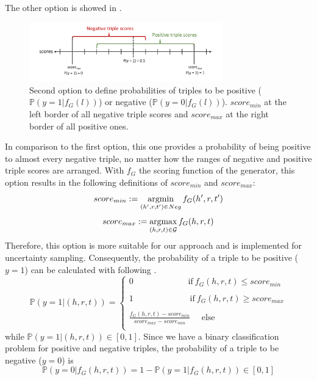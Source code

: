 The other option is showed in .
\begin{figure}[t]
  \centering
    \includegraphics[width=0.75\textwidth]{figures/positives_negatives2.pdf}
  \caption{Second option to define probabilities of triples to be positive ($\mathds{P}(y = 1 | f_G(l))$) or negative ($\mathds{P}(y = 0 | f_G(l))$). 
  $score_{min}$ at the left border of all negative triple scores and $score_{max}$ at the right border of all positive ones.}
  \label{fig:positives_negatives2}
\end{figure}
In comparison to the first option, this one provides a probability of being positive to almost every negative triple, no matter how the ranges of negative and positive triple scores are arranged.
With $f_G$ the scoring function of the generator, this option results in the following definitions of $score_{min}$ and $score_{max}$:
\begin{equation} \label{eqn:opt1_score_min}
    score_{min} := \operatorname*{argmin}_{(h',r,t') \in Neg}{f_G(h',r,t')}
\end{equation}
\begin{equation} \label{eqn:opt1_score_max}
    score_{max} := \operatorname*{argmax}_{(h,r,t) \in \mathcal{G}}{f_G(h,r,t)}
\end{equation}
Therefore, this option is more suitable for our approach and is implemented for uncertainty sampling.
Consequently, the probability of a triple to be positive ($y = 1$) can be calculated with following .
\begin{equation}  \label{eqn:positive_probability}
    \mathds{P}(y = 1|(h, r, t)) =
    \begin{cases}
        0 \ \ \ \ \ \ \ \ \ \ \ \ \ \ \ \ \ \ \ \ \ \ \ \ \ \ \  \ \   
         \text{if} \  f_G(h,r,t) \leq score_{min}
         
        \\ \\
        1 \ \ \ \ \ \ \ \ \ \ \ \ \ \ \ \ \ \ \ \ \ \ \ \ \ \ \   \ \ \
        \text{if} \ f_G(h,r,t) \geq score_{max}
         
        \\ \\
        \frac{f_G(h,r,t) - score_{min}}{score_{max} - score_{min}}
        \ \ \ \ \ \ 
         \text{else}
        \\
    \end{cases} 
\end{equation}
while $\mathds{P}(y = 1|(h, r, t))  \in [0, 1]$.
Since we have a binary classification problem for positive and negative triples, the probability of a triple to be negative ($y=0$) is
\begin{equation} \label{eqn:negative_probability}
    \mathds{P}(y = 0 | f_G(h, r, t)) = 1 - \mathds{P}(y = 1| f_G(h, r, t)) \in [0,1]
\end{equation}


